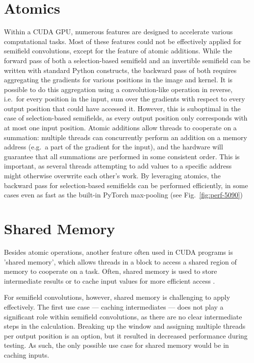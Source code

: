 \documentclass[a4paper, 12pt, openright]{report}
\begin{document}
\section{Atomics}
\label{sec:atomics}
Within a CUDA GPU, numerous features are designed to accelerate various computational tasks. Most of these features could not be effectively applied for semifield convolutions, except for the feature of atomic additions. While the forward pass of both a selection-based semifield and an invertible semifield can be written with standard Python constructs, the backward pass of both requires aggregating the gradients for various positions in the image and kernel. It is possible to do this aggregation using a convolution-like operation in reverse, i.e.\ for every position in the input, sum over the gradients with respect to every output position that could have accessed it. However, this is suboptimal in the case of selection-based semifields, as every output position only corresponds with at most one input position. Atomic additions allow threads to cooperate on a summation: multiple threads can concurrently perform an addition on a memory address (e.g.\ a part of the gradient for the input), and the hardware will guarantee that all summations are performed in some consistent order. This is important, as several threads attempting to add values to a specific address might otherwise overwrite each other's work. By leveraging atomics, the backward pass for selection-based semifields can be performed efficiently, in some cases even as fast as the built-in PyTorch max-pooling (see Fig.\ \ref{fig:perf-5090})
\vspace{-2pt}
\section{Shared Memory}
Besides atomic operations, another feature often used in CUDA programs is 'shared memory', which allows threads in a block to access a shared region of memory to cooperate on a task. Often, shared memory is used to store intermediate results or to cache input values for more efficient access \cite{cuda}.

For semifield convolutions, however, shared memory is challenging to apply effectively. The first use case --- caching intermediates --- does not play a significant role within semifield convolutions, as there are no clear intermediate steps in the calculation. Breaking up the window and assigning multiple threads per output position is an option, but it resulted in decreased performance during testing. As such, the only possible use case for shared memory would be in caching inputs. 
\end{document}
